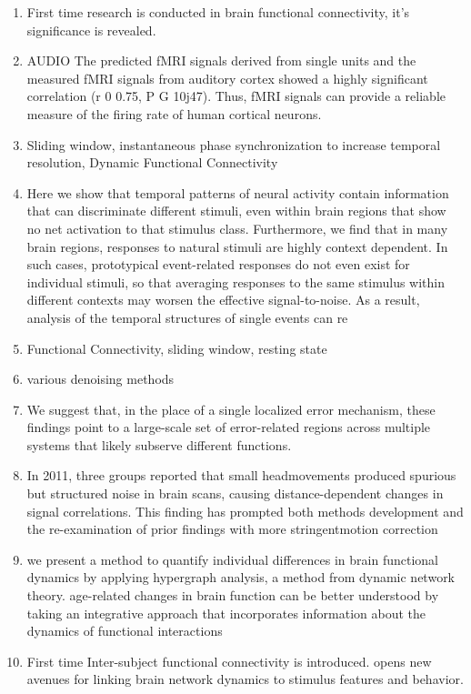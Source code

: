 \documentclass[12pt]{article}
\begin{document}
\begin{enumerate}
\begin{enumerate}
\item \cite{olaf2005} First time research is conducted in brain functional connectivity, it's significance is revealed.
\item \cite{hasson2005} AUDIO The predicted fMRI signals derived from single units and the measured fMRI signals from auditory cortex showed a highly significant correlation (r 0 0.75, P G 10j47). Thus, fMRI signals can provide a reliable measure of the firing rate of human cortical neurons.
\item \cite{enrico2011} Sliding window, instantaneous phase synchronization to increase temporal resolution, Dynamic Functional Connectivity
\item \cite{hasson2012} Here we show that temporal patterns of neural activity contain information that can discriminate different stimuli, even within brain regions that show no net activation to that stimulus class. Furthermore, we find that in many brain regions, responses to natural stimuli are highly context dependent. In such cases, prototypical event-related responses do not even exist for individual stimuli, so that averaging responses to the same stimulus within different contexts may worsen the effective signal-to-noise. As a result, analysis of the temporal structures of single events can re
\item \cite{elena2012} Functional Connectivity, sliding window, resting state
\item \cite{peterson9} various denoising methods
\item \cite{peterson19} We suggest that, in the place of a single localized error mechanism, these findings point to a large-scale set of error-related regions across multiple systems that likely subserve different functions.
\item \cite{peterson20} In 2011, three groups reported that small headmovements produced spurious but structured noise in brain scans, causing distance-dependent changes in signal correlations. This finding has prompted both methods development and the re-examination of prior findings with more stringentmotion correction
\item \cite{davidson2016} we present a method to quantify individual differences in brain functional dynamics by applying hypergraph analysis, a method from dynamic network theory. age-related changes in brain function can be better understood by taking an integrative approach that incorporates information about the dynamics of functional interactions
\item \cite{hasson2016} First time Inter-subject functional connectivity is introduced. opens new avenues for linking brain network dynamics to stimulus features and behavior.

\end{enumerate}
\end{enumerate}
\end{document}
